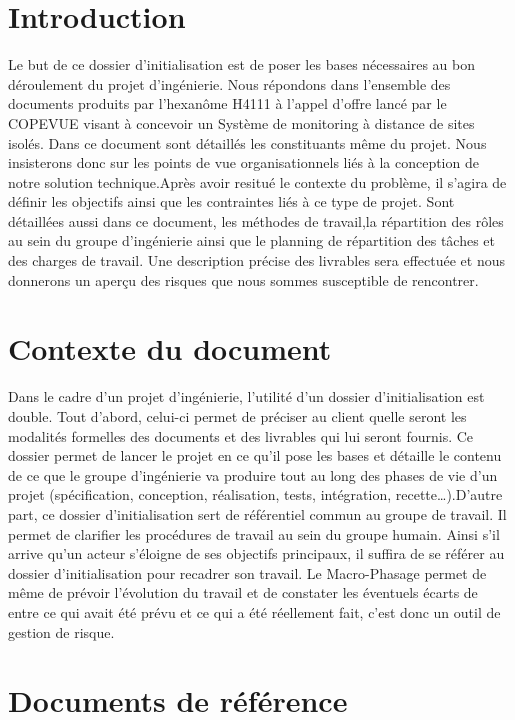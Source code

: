 

\section{Introduction}

Le but de ce dossier d'initialisation est de poser les bases nécessaires au bon déroulement du projet d'ingénierie. Nous répondons dans l'ensemble des documents produits par l'hexanôme H4111 à l'appel d'offre lancé par le COPEVUE visant à concevoir un Système de monitoring à distance de sites isolés. Dans ce document sont détaillés les constituants même du projet. Nous insisterons donc sur les points de vue organisationnels liés à la conception de notre solution technique.Après avoir resitué le contexte du problème, il s'agira de définir les objectifs ainsi que les contraintes liés à ce type de projet. Sont détaillées aussi dans ce document, les méthodes de travail,la répartition des rôles au sein du groupe d'ingénierie ainsi que le planning de répartition des tâches et des charges de travail. Une description précise des livrables sera effectuée et nous donnerons un aperçu des risques que nous sommes susceptible de rencontrer.

\section{Contexte du document}
Dans le cadre d'un projet d'ingénierie, l'utilité d'un dossier d'initialisation est double. Tout d'abord, celui-ci permet de préciser au client quelle seront les modalités formelles des documents et des livrables qui lui seront fournis. Ce dossier permet de lancer le projet en ce qu'il pose les bases et détaille le contenu de ce que le groupe d'ingénierie va produire tout au long des phases de vie d'un projet (spécification, conception, réalisation, tests, intégration, recette…).D'autre part, ce dossier d'initialisation sert de référentiel commun au groupe de travail. Il permet de clarifier les procédures de travail au sein du groupe humain. Ainsi s'il arrive qu'un acteur s'éloigne de ses objectifs principaux, il suffira de se référer au dossier d'initialisation pour recadrer son travail. Le Macro-Phasage permet de même de prévoir l'évolution du travail et de constater les éventuels écarts de entre ce qui avait été prévu et ce qui a été réellement fait, c'est donc un outil de gestion de risque.
\section{Documents de référence}
    
